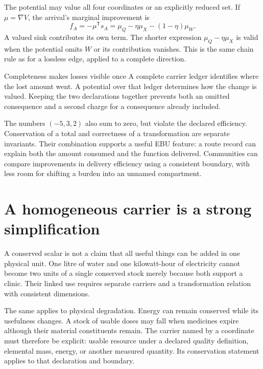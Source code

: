 The potential may value all four coordinates or an explicitly reduced set. If $\mu=\nabla V$, the arrival's marginal improvement is
\begin{equation}\label{eq:complete-arrival-field}
 f_A=-\mu^{\mathsf T}s_A
     =\mu_Q-\eta\mu_X-(1-\eta)\mu_W.
\end{equation}
A valued sink contributes its own term. The shorter expression $\mu_Q-\eta\mu_X$ is valid when the potential omits $W$ or its contribution vanishes. This is the same chain rule as for a lossless edge, applied to a complete direction.

\begin{intuitionbox}{Completeness makes losses visible once}
A complete carrier ledger identifies where the lost amount went. A potential over that ledger determines how the change is valued. Keeping the two declarations together prevents both an omitted consequence and a second charge for a consequence already included.
\end{intuitionbox}

The numbers $(-5,3,2)$ also sum to zero, but violate the declared efficiency. Conservation of a total and correctness of a transformation are separate invariants. Their combination supports a useful EBU feature: a route record can explain both the amount consumed and the function delivered. Communities can compare improvements in delivery efficiency using a consistent boundary, with less room for shifting a burden into an unnamed compartment.

\section{A homogeneous carrier is a strong simplification}
A conserved scalar is not a claim that all useful things can be added in one physical unit. One litre of water and one kilowatt-hour of electricity cannot become two units of a single conserved stock merely because both support a clinic. Their linked use requires separate carriers and a transformation relation with consistent dimensions.

The same applies to physical degradation. Energy can remain conserved while its usefulness changes. A stock of usable doses may fall when medicines expire although their material constituents remain. The carrier named by a coordinate must therefore be explicit: usable resource under a declared quality definition, elemental mass, energy, or another measured quantity. Its conservation statement applies to that declaration and boundary.

